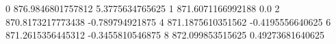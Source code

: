 0 876.9846801757812 5.3775634765625
1 871.6071166992188 0.0
2 870.8173217773438 -0.789794921875
4 871.1875610351562 -0.4195556640625
6 871.2615356445312 -0.3455810546875
8 872.099853515625 0.49273681640625
